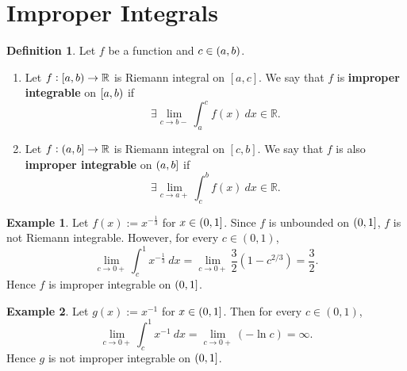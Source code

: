 \documentclass[12pt,openany]{book}
\theoremstyle{definition}
\newtheorem{definition}{Definition}[chapter]
\newtheorem{remark}{Remark}[chapter]
\newtheorem{example}{Example}[chapter]
\newcommand{\R}{\mathbb{R}}
\begin{document}
	\section{Improper Integrals}
	\begin{tcolorbox}[colframe=defcolor, title={\color{white}\bf Improper Integral}]
		\begin{definition}
			Let $f$ be a function and $c\in\intoo{a,b}$.
			\begin{enumerate}[(1)]
				\item Let $f:\intco{a,b}\to\R$ is Riemann integral on $[a,c]$. We say that $f$ is \textbf{improper integrable} on $\intco{a,b}$ if \[
				\exists\lim\limits_{c\to b-}\int_a^cf(x)\ dx\in\R.
				\]
				\item Let $f:\intoc{a,b}\to\R$ is Riemann integral on $[c,b]$. We say that $f$ is also \textbf{improper integrable} on $\intoc{a,b}$ if \[
				\exists\lim\limits_{c\to a+}\int_c^bf(x)\ dx\in\R.
				\]
			\end{enumerate}
		\end{definition}
	\end{tcolorbox}

	\begin{example}
		Let $f(x):=x^{-\frac{1}{3}}$ for $x\in\intoc{0,1}$. Since $f$ is unbounded on $\intoc{0,1}$, $f$ is not Riemann integrable. However, for every $c\in(0,1)$, \[
		\lim\limits_{c\to 0+}\int_c^1x^{-\frac{1}{3}}\ dx=\lim\limits_{c\to 0+}\frac{3}{2}(1-c^{2/3})=\frac{3}{2}.
		\] Hence $f$ is improper integrable on $\intoc{0,1}$.
	\end{example}
	\vspace{10pt}
	\begin{example}
	Let $g(x):=x^{-1}$ for $x\in\intoc{0,1}$. Then for every $c\in(0,1)$, \[
	\lim\limits_{c\to 0+}\int_c^1x^{-1}\ dx=\lim\limits_{c\to 0+}(-\ln c)=\infty.
	\] Hence $g$ is not improper integrable on $\intoc{0,1}$.
	\end{example}
	\vspace{20pt}
	
\end{document}
